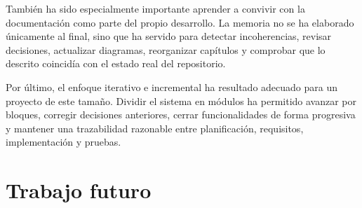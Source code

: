 También ha sido especialmente importante aprender a convivir con la documentación como parte del propio desarrollo. La memoria no se ha elaborado únicamente al final, sino que ha servido para detectar incoherencias, revisar decisiones, actualizar diagramas, reorganizar capítulos y comprobar que lo descrito coincidía con el estado real del repositorio.

Por último, el enfoque iterativo e incremental ha resultado adecuado para un proyecto de este tamaño. Dividir el sistema en módulos ha permitido avanzar por bloques, corregir decisiones anteriores, cerrar funcionalidades de forma progresiva y mantener una trazabilidad razonable entre planificación, requisitos, implementación y pruebas.

\section{Trabajo futuro}
\label{sec:futurework}

